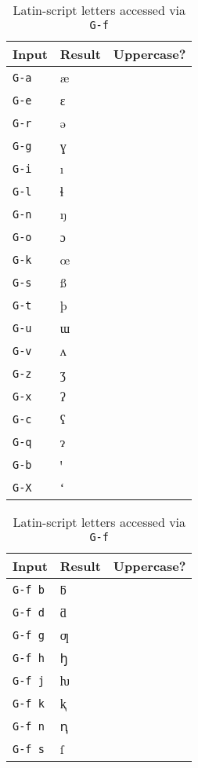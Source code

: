\documentclass[oneside]{memoir}
\newcommand{\cmark}{\ding{51}}
\newcommand{\xmark}{\ding{55}}
\newcommand{\key}{\verb}
\begin{document}
{{{\begin{table}
\centering
\begin{minipage}{0.3\linewidth}
\centering
\caption{Latin-script letters accessed via a single key}
\label{tab:single_key}
\begin{tabular}{lll}
\toprule
Input & Result & Uppercase? \\
\midrule
\key|G-a| & æ & \cmark \\
\key|G-e| & ɛ & \cmark \\
\key|G-r| & ə & \cmark \\
\key|G-g| & ɣ & \cmark \\
\key|G-i| & ı & \xmark \\
\key|G-l| & ɬ & \cmark \\
\key|G-n| & ŋ & \cmark \\
\key|G-o| & ɔ & \cmark \\
\key|G-k| & œ & \cmark \\
\key|G-s| & ß & \cmark \\
\key|G-t| & þ & \cmark \\
\key|G-u| & ɯ & \cmark \\
\key|G-v| & ʌ & \cmark \\
\key|G-z| & ʒ & \cmark \\
\key|G-x| & ʔ & \xmark \\
\key|G-c| & ʕ & \xmark \\
\key|G-q| & ɂ & \cmark \\
\key|G-b| & ꞌ & \cmark \\
\key|G-X| & ʻ & \xmark \\
\bottomrule
\end{tabular}
\end{minipage}\hfill
\begin{minipage}{0.3\linewidth}
\centering
\cprotect\caption{Latin-script letters accessed via \key|G-f|}
\label{tab:letters_g-f}
\begin{tabular}{lll}
\toprule
Input & Result & Uppercase? \\
\midrule
\key|G-f b| & ƃ & \cmark \\
\key|G-f d| & ƌ & \cmark \\
\key|G-f g| & ƣ & \cmark \\
\key|G-f h| & ꜧ & \cmark \\
\key|G-f j| & ƕ & \cmark \\
\key|G-f k| & ⱪ & \cmark \\
\key|G-f n| & ꞑ & \cmark \\
\key|G-f s| & ſ & \xmark \\

\end{tabular}
\end{minipage}
\end{table}}}}
\end{document}

